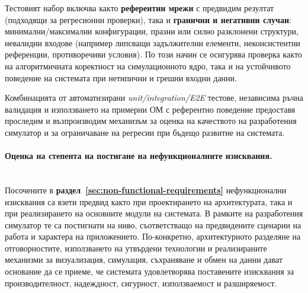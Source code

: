 Тестовият набор включва както \textbf{референтни мрежи} с предвидим резултат (подходящи за регресионни проверки), така и \textbf{гранични и негативни случаи}: минимални/максимални конфигурации, празни или силно разклонени структури, невалидни входове (например липсващи задължителни елементи, неконсистентни референции, противоречиви условия). По този начин се осигурява проверка както на алгоритмичната коректност на симулационното ядро, така и на устойчивото поведение на системата при нетипични и грешни входни данни.

Комбинацията от автоматизирани \textit{unit/integration/E2E} тестове, независима ръчна валидация и използването на примерни ОМ с референтно поведение предоставя проследим и възпроизводим механизъм за оценка на качеството на разработения симулатор и за ограничаване на регресии при бъдещо развитие на системата.

\paragraph{Оценка на степента на постигане на нефункционалните изисквания.}
\mbox{} \\
Посочените в \textbf{раздел~\ref{sec:non-functional-requirements}} нефункционални изисквания са взети предвид както при проектирането на архитектурата, така и при реализирането на основните модули на системата. В рамките на разработения симулатор те са постигнати на ниво, съответстващо на предвидените сценарии на работа и характера на приложението. По-конкретно, архитектурното разделяне на отговорностите, използването на утвърдени технологии и реализираните механизми за визуализация, симулация, съхраняване и обмен на данни дават основание да се приеме, че системата удовлетворява поставените изисквания за производителност, надеждност, сигурност, използваемост и разширяемост.